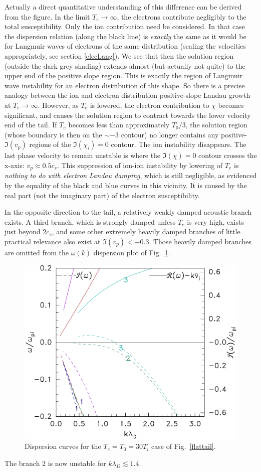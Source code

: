 \documentclass[12pt]{article}
\begin{document}
Actually a direct quantitative understanding of this difference can be
derived from the figure. In the limit $T_e\to \infty$, the electrons
contribute negligibly to the total susceptibility. Only the ion
contribution need be considered. In that case the dispersion relation
(along the black line) is \emph{exactly} the same as it would be for
Langmuir waves of electrons of the same distribution (scaling the
velocities appropriately, see section \ref{elecLang}). We see that
then the solution region (outside the dark grey shading) extends
almost (but actually not quite) to the upper end of the positive slope
region. This is exactly the region of Langmuir wave instability for an
electron distribution of this shape. So there is a precise analogy
between the ion and electron distribution positive-slope Landau growth
at $T_e\to\infty$. However, as $T_e$ is lowered, the electron
contribution to $\chi$ becomes significant, and causes the solution
region to contract towards the lower velocity end of the tail. If
$T_e$ becomes less than approximately $T_0/3$, the solution region
(whose boundary is then on the $\sim-3$ contour) no longer contains
any positive-$\Im(v_p)$ regions of the $\Im(\chi_i)=0$ contour. The
ion instability disappears.  The last phase velocity to remain
unstable is where the $\Im(\chi)=0$ contour crosses the x-axis:
$v_p\approx 0.5 c_s$. This suppression of ion-ion instability by
lowering of $T_e$ is \emph{nothing to do with electron Landau
  damping}, which is still negligible, as evidenced by the equality of
the black and blue curves in this vicinity. It is caused by the real
part (not the imaginary part) of the electron susceptibility.

In the opposite direction to the tail, a relatively weakly damped
acoustic branch exists. A third branch, which is strongly damped
unless $T_e$ is very high, exists just beyond $2c_{s}$, and some other
extremely heavily damped branches of little practical relevance also exist at
$\Im(v_{p})<-0.3$. Those heavily damped branches are omitted from the
$\omega(k)$ dispersion plot of Fig.\ \ref{fig:flattailok}.
\begin{figure}[htp]
  \centering
  \includegraphics[width=0.5\hsize]{flattailok}
  \caption{Dispersion curves for the $T_e=T_0=30T_i$ case of Fig.\
    \ref{flattail}.}
  \label{fig:flattailok}
\end{figure}
The branch 2 is now unstable for $k\lambda_D\lesssim 1.4$.
\end{document}
